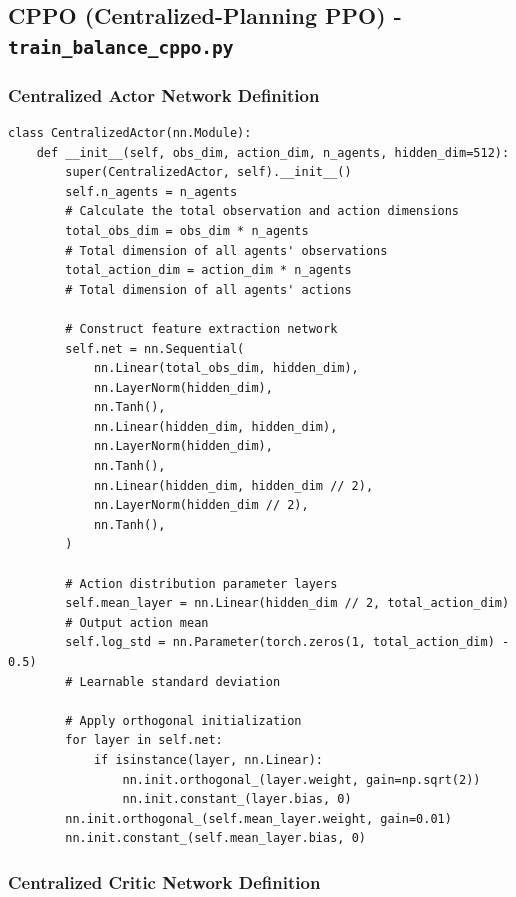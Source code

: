 \documentclass[12pt]{article}
\begin{document}
\subsection{CPPO (Centralized-Planning PPO) - \texttt{train\_balance\_cppo.py}}

\subsubsection{Centralized Actor Network Definition}
\begin{verbatim}
class CentralizedActor(nn.Module):
    def __init__(self, obs_dim, action_dim, n_agents, hidden_dim=512):
        super(CentralizedActor, self).__init__()
        self.n_agents = n_agents
        # Calculate the total observation and action dimensions
        total_obs_dim = obs_dim * n_agents  
        # Total dimension of all agents' observations
        total_action_dim = action_dim * n_agents  
        # Total dimension of all agents' actions
        
        # Construct feature extraction network
        self.net = nn.Sequential(
            nn.Linear(total_obs_dim, hidden_dim),
            nn.LayerNorm(hidden_dim),
            nn.Tanh(),
            nn.Linear(hidden_dim, hidden_dim),
            nn.LayerNorm(hidden_dim),
            nn.Tanh(),
            nn.Linear(hidden_dim, hidden_dim // 2),
            nn.LayerNorm(hidden_dim // 2),
            nn.Tanh(),
        )
        
        # Action distribution parameter layers
        self.mean_layer = nn.Linear(hidden_dim // 2, total_action_dim)  
        # Output action mean
        self.log_std = nn.Parameter(torch.zeros(1, total_action_dim) - 0.5)  
        # Learnable standard deviation
        
        # Apply orthogonal initialization
        for layer in self.net:
            if isinstance(layer, nn.Linear):
                nn.init.orthogonal_(layer.weight, gain=np.sqrt(2))
                nn.init.constant_(layer.bias, 0)
        nn.init.orthogonal_(self.mean_layer.weight, gain=0.01)
        nn.init.constant_(self.mean_layer.bias, 0)
\end{verbatim}

\subsubsection{Centralized Critic Network Definition}
\end{document}
